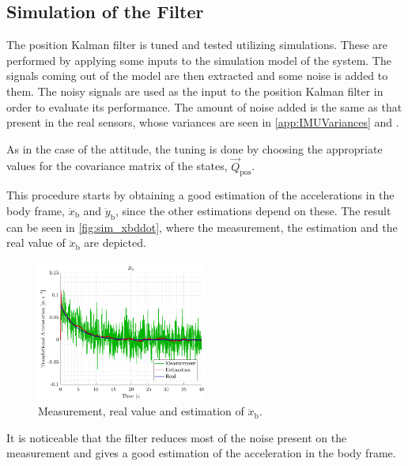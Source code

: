 \subsection{Simulation of the Filter}
The position Kalman filter is tuned and tested utilizing simulations. These are performed by applying some inputs to the simulation model of the system. The signals coming out of the model are then extracted and some noise is added to them. The noisy signals are used as the input to the position Kalman filter in order to evaluate its performance. The amount of noise added is the same as that present in the real sensors, whose variances are seen in \autoref{app:IMUVariances} and .

As in the case of the attitude, the tuning is done by choosing the appropriate values for the covariance matrix of the states, $\vec{Q}_\mathrm{pos}$. 

This procedure starts by obtaining a good estimation of the accelerations in the body frame, $\ddot{x}_\mathrm{b}$ and $\ddot{y}_\mathrm{b}$, since the other estimations depend on these. The result can be seen in \autoref{fig:sim_xbddot}, where the measurement, the estimation and the real value of $\ddot{x}_\mathrm{b}$ are depicted.
\begin{figure}[H]
    \includegraphics[width=0.5\textwidth]{figures/sim_xbddot}
    \caption{ Measurement, real value and estimation of $\ddot{x}_\mathrm{b}$.}
    \label{fig:sim_xbddot}
\end{figure}
%
It is noticeable that the filter reduces most of the noise present on the measurement and gives a good estimation of the acceleration in the body frame.
 
